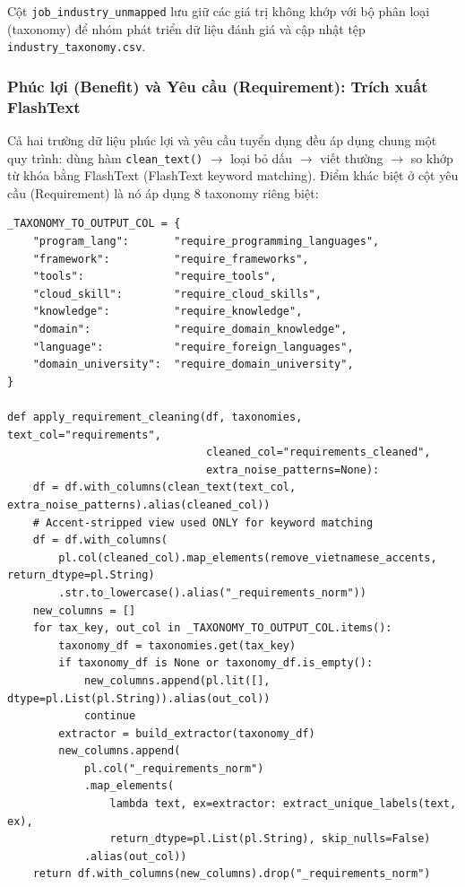 Cột \texttt{job\_industry\_unmapped} lưu giữ các giá trị không khớp với
bộ phân loại (taxonomy) để nhóm phát triển dữ liệu đánh giá và cập nhật tệp \texttt{industry\_taxonomy.csv}.

\subsubsection{Phúc lợi (Benefit) và Yêu cầu (Requirement): Trích xuất FlashText}

Cả hai trường dữ liệu phúc lợi và yêu cầu tuyển dụng đều áp dụng chung một quy trình: dùng hàm \texttt{clean\_text()}
$\to$ loại bỏ dấu $\to$ viết thường $\to$ so khớp từ khóa bằng FlashText (FlashText keyword matching).
Điểm khác biệt ở cột yêu cầu (Requirement) là nó áp dụng 8 taxonomy riêng biệt:

\begin{lstlisting}[style=pystyle, caption={Yêu cầu tuyển dụng: FlashText tích hợp 8 taxonomy}, label={lst:clean-requirement}]
_TAXONOMY_TO_OUTPUT_COL = {
    "program_lang":       "require_programming_languages",
    "framework":          "require_frameworks",
    "tools":              "require_tools",
    "cloud_skill":        "require_cloud_skills",
    "knowledge":          "require_knowledge",
    "domain":             "require_domain_knowledge",
    "language":           "require_foreign_languages",
    "domain_university":  "require_domain_university",
}

def apply_requirement_cleaning(df, taxonomies, text_col="requirements",
                               cleaned_col="requirements_cleaned",
                               extra_noise_patterns=None):
    df = df.with_columns(clean_text(text_col, extra_noise_patterns).alias(cleaned_col))
    # Accent-stripped view used ONLY for keyword matching
    df = df.with_columns(
        pl.col(cleaned_col).map_elements(remove_vietnamese_accents, return_dtype=pl.String)
        .str.to_lowercase().alias("_requirements_norm"))
    new_columns = []
    for tax_key, out_col in _TAXONOMY_TO_OUTPUT_COL.items():
        taxonomy_df = taxonomies.get(tax_key)
        if taxonomy_df is None or taxonomy_df.is_empty():
            new_columns.append(pl.lit([], dtype=pl.List(pl.String)).alias(out_col))
            continue
        extractor = build_extractor(taxonomy_df)
        new_columns.append(
            pl.col("_requirements_norm")
            .map_elements(
                lambda text, ex=extractor: extract_unique_labels(text, ex),
                return_dtype=pl.List(pl.String), skip_nulls=False)
            .alias(out_col))
    return df.with_columns(new_columns).drop("_requirements_norm")
\end{lstlisting}

